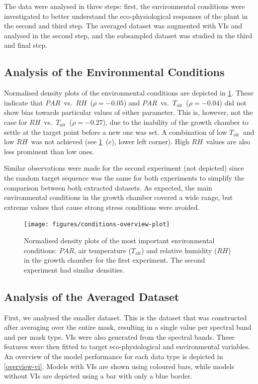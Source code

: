 \documentclass[10pt,authoryear,a4paper]{elsarticle}
\newcommand{\Tair}{$T_\text{air}$}
\newcommand{\RH}{$RH$}
\newcommand{\PAR}{$PAR$}
\begin{document}
    The data were analysed in three steps: first, the environmental conditions were investigated to better understand the eco-physiological responses of the plant in the second and third step. The averaged dataset was augmented with VIs and analysed in the second step, and the subsampled dataset was studied in the third and final step. 

    \subsection{Analysis of the Environmental Conditions}
    
        Normalised density plots of the environmental conditions are depicted in \cref{conditions-plot}. These indicate that \PAR\ vs.\ \RH\ ($\rho = -0.05$) and \PAR\ vs.\ \Tair\  ($\rho = -0.04$) did not show bias towards particular values of either parameter. This is, however, not the case for \RH\ vs.\ \Tair\ ($\rho = -0.27$), due to the inability of the growth chamber to settle at the target point before a new one was set. A combination of low \Tair\ and low \RH\ was not achieved (see \cref{conditions-plot}~(c), lower left corner). High \RH\ values are also less prominent than low ones.
        
        Similar observations were made for the second experiment (not depicted) since the random target sequence was the same for both experiments to simplify the comparison between both extracted datasets. As expected, the main environmental conditions in the growth chamber covered a wide range, but extreme values that cause strong stress conditions were avoided.
    
        \begin{figure}[thb]
            \centering
            \texttt{[image: figures/conditions-overview-plot]}
            \caption{Normalised density plots of the most important environmental conditions: \PAR, air temperature (\Tair) and relative humidity (\RH) in the growth chamber for the first experiment. The second experiment had similar densities.}
            \label{conditions-plot}
        \end{figure}

    \subsection{Analysis of the Averaged Dataset}
    
        First, we analysed the smaller dataset. This is the dataset that was constructed after averaging over the entire mask, resulting in a single value per spectral band and per mask type. VIs were also generated from the spectral bands. These features were then fitted to target eco-physiological and environmental variables. An overview of the model performance for each data type is depicted in \cref{overview-vi}. Models with VIs are shown using coloured bars, while models without VIs are depicted using a bar with only a blue border.
        
\end{document}
